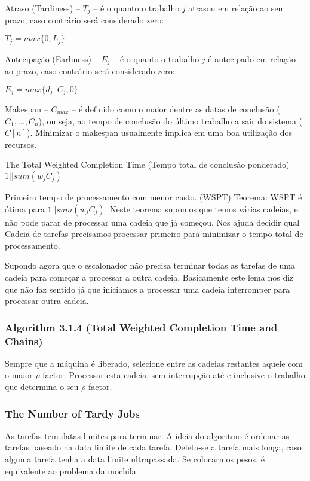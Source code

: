 Atraso (Tardiness) – $T_j$ – é o quanto o trabalho $j$ atrasou em relação ao seu prazo, caso contrário será considerado zero:
 
$T_j = max\{0, L_j\}$ 

Antecipação (Earliness) – $E_j$ – é o quanto o trabalho $j$ é antecipado em relação ao prazo, caso contrário será considerado zero: 
 
$ E_j = max\{d_j – C_j, 0\} $
 
Makespan – $C_{max}$ – é definido como o maior dentre as datas de 
conclusão ($C_1, . . ., C_n$), ou seja, ao tempo de conclusão do último trabalho a sair do sistema ($C[n]$). Minimizar o makespan usualmente implica em uma boa utilização dos recursos. 

The Total Weighted Completion Time (Tempo total de conclusão ponderado) \\ $1||sum(w_jC_j)$

Primeiro tempo de processamento com menor custo. (WSPT)
Teorema: WSPT é ótima para $1||sum(w_jC_j)$. Neste teorema supomos que temos várias cadeias, e não pode parar de processar uma cadeia que já começou. Nos ajuda decidir qual Cadeia de tarefas precisamos processar primeiro para minimizar o tempo total de processamento.

Supondo agora que o escalonador não precisa terminar todas as tarefas de uma cadeia para começar a processar a outra cadeia. Basicamente este lema nos diz que não faz sentido já que iniciamos a processar uma cadeia interromper para processar outra cadeia. 

\subsubsection{Algorithm 3.1.4 (Total Weighted Completion Time and Chains)}

	Sempre que a máquina é liberado, selecione entre as cadeias restantes aquele com o maior $\rho$-factor. Processar esta cadeia, sem interrupção até e inclusive o trabalho que determina o seu $\rho$-factor.


\subsubsection{The Number of Tardy Jobs}
As tarefas tem datas limites para terminar. A ideia do algoritmo é ordenar as tarefas baseado na data limite de cada tarefa. Deleta-se a tarefa mais longa, caso alguma tarefa tenha a data limite ultrapassada. Se colocarmos pesos, é equivalente ao problema da mochila.

